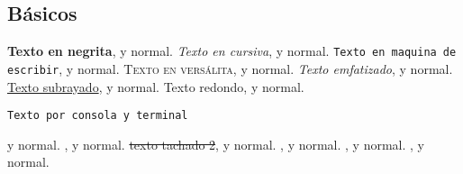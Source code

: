 \documentclass{article}
\begin{document}
\subsection{Básicos}
\textbf{Texto en negrita}, y normal.
\newline
\newline
\textit{Texto en cursiva}, y normal.
\newline
\newline
\texttt{Texto en maquina de escribir}, y normal.
\newline
\newline
\textsc{Texto en versálita}, y normal.
\newline
\newline
\emph{Texto emfatizado}, y normal.
\newline
\newline
\underline{Texto subrayado}, y normal.
\newline
\newline
\textrm{Texto redondo}, y normal.
\begin{verbatim}
Texto por consola y terminal
\end{verbatim}
y normal.
\newline
\newline
{}, y normal. %
\newline
\newline
\sout{texto tachado 2}, y normal. %
\newline
\newline
{}, y normal. %
\newline
\newline
{}, y normal. %
\newline
\newline
{}, y normal. %
\clearpage
\end{document}
